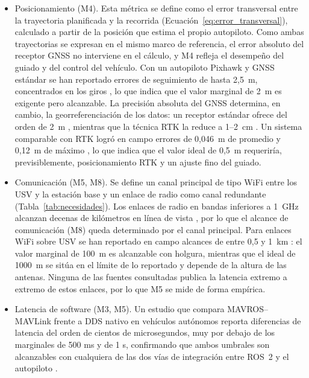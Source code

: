 \begin{itemize}
    \item Posicionamiento (M4). Esta métrica se define como el error transversal entre la trayectoria planificada 
    y la recorrida (Ecuación~\ref{eq:error_transversal}), calculado a partir de la posición 
    que estima el propio autopiloto. Como ambas trayectorias se expresan en el mismo marco de referencia, 
    el error absoluto del receptor GNSS no interviene en el cálculo, y M4 refleja el desempeño del guiado 
    y del control del vehículo. Con un autopiloto Pixhawk y GNSS estándar se han reportado errores de 
    seguimiento de hasta 2,5~m, concentrados en los giros \cite{sotelo2023}, lo que indica que el valor 
    marginal de 2~m es exigente pero alcanzable. La precisión absoluta del GNSS determina, en cambio, 
    la georreferenciación de los datos: un receptor estándar ofrece del orden de 2~m \cite{Cite29}, mientras 
    que la técnica RTK la reduce a 1--2~cm \cite{Cite13}. Un sistema comparable con RTK logró en campo 
    errores de 0,046~m de promedio y 0,12~m de máximo \cite{Cite9}, lo que indica que el valor ideal 
    de 0,5~m requeriría, previsiblemente, posicionamiento RTK y un ajuste fino del guiado.
    \item Comunicación (M5, M8). Se define un canal principal de tipo WiFi entre los 
    USV y la estación base y un enlace de radio como canal redundante (Tabla~\ref{tab:necesidades}). Los enlaces 
    de radio en bandas inferiores a 1~GHz alcanzan decenas de kilómetros en línea de 
    vista \cite{gogendeau2024} \cite{Cite10}, por lo que el alcance de comunicación (M8) queda determinado por el 
    canal principal. Para enlaces WiFi sobre USV se han reportado en campo alcances de entre 0,5 y 1~km \cite{sears2024}: el valor marginal de 100~m es alcanzable con holgura, mientras que el ideal de 1000~m se 
    sitúa en el límite de lo reportado y depende de la altura de las antenas. Ninguna de las fuentes consultadas 
    publica la latencia extremo a extremo de estos enlaces, por lo que M5 se mide de forma empírica.
    \item Latencia de software (M3, M5). Un estudio que compara MAVROS–MAVLink frente a DDS 
    nativo en vehículos autónomos reporta diferencias de latencia del orden de cientos de microsegundos, 
    muy por debajo de los marginales de 500 ms y de 1 s, confirmando que ambos umbrales son alcanzables con 
    cualquiera de las dos vías de integración entre ROS~2 y el autopiloto \cite{Cite12}.
\end{itemize}

